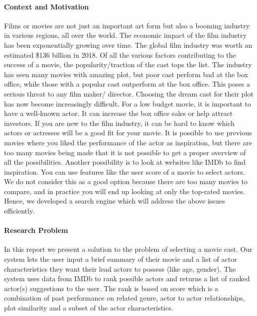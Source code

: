 
\noindent

\paragraph{\textbf{Context and Motivation}}
Films or movies are not just an important art form but also a booming industry in various regions, all over the world. The economic impact of the film industry has been exponentially growing over time. The global film industry was worth an estimated \$136 billion in 2018. Of all the various factors contributing to the success of a movie, the popularity/traction of the cast tops the list. The industry has seen many movies with amazing plot, but poor cast perform bad at the box office, while those with a popular cast outperform at the box office. This poses a serious threat to any film maker/ director. Choosing the dream cast for their plot has now become increasingly difficult. For a low budget movie, it is important to have a well-known actor. It can increase the box office sales or help attract investors\cite{StephenFollows}. If you are new to the film industry, it can be hard to know which actors or actresses will be a good fit for your movie. It is possible to use previous movies where you liked the performance of the actor as inspiration, but there are too many movies being made that it is not possible to get a proper overview of all the possibilities. Another possibility is to look at websites like IMDb\cite{IMDb} to find inspiration. You can use features like the user score of a movie to select actors. We do not consider this as a good option because there are too many movies to compare, and in practice you will end up looking at only the top-rated movies. Hence, we developed a search engine which will address the above issues efficiently.



\paragraph{\textbf{Research Problem}}
In this report we present a solution to the problem of selecting a movie cast. Our system lets the user input a brief summary of their movie and a list of actor characteristics they want their lead actors to possess (like age, gender). The system uses data from IMDb to rank possible actors and returns a list of ranked actor(s) suggestions to the user. The rank is based on score which is a combination of past performance on related genre, actor to actor relationships, plot similarity and a subset of the actor characteristics.



